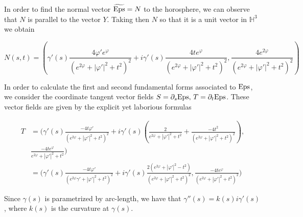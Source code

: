 \documentclass[12pt]{amsart}
\newcommand{\Eps}{{\rm Eps}}
\begin{document}
In order to find the normal vector $\widetilde{\Eps}=N$ to the horosphere, we can observe that $N$ is parallel to the vector $Y$. Taking then $N$ so that it is a unit vector in $\mathbb{H}^3$ we obtain


\begin{equation}\label{eq:normalvector}
N(s,t) = \left( \gamma'(s)\frac{4\varphi'e^{\varphi}}{(e^{2\varphi}+|\varphi'|^2+t^2)^2}+ i\gamma'(s)\frac{4te^{\varphi}}{(e^{2\varphi}+|\varphi'|^2+t^2)^2},  \frac{4e^{2\varphi}}{(e^{2\varphi}+|\varphi'|^2+t^2)^2}\right)
\end{equation}

In order to calculate the first and second fundamental forms associated to $\Eps$, we consider the coordinate tangent vector fields $S= \partial_s\Eps,\, T=\partial_t\Eps$. These vector fields are given by the explicit yet laborious formulas

\begin{equation}\label{eq:Tvector}
\begin{split}
    T &= \bigg( \gamma'(s)\frac{-4t\varphi'}{(e^{2\varphi}+|\varphi'|^2+t^2)^2}+ i\gamma'(s)\left(\frac{2}{e^{2\varphi}+|\varphi'|^2+t^2} + \frac{-4t^2}{(e^{2\varphi}+|\varphi'|^2+t^2)^2}\right),\\&  \frac{-4te^{\varphi}}{e^{2\varphi}+|\varphi'|^2+t^2}\bigg)
    \\& = \bigg(\gamma'(s)\frac{-4t\varphi'}{(e^{2\varphi}\gamma'+|\varphi'|^2+t^2)^2} +  i\gamma'(s)\frac{2(e^{2\varphi} + |\varphi'|^2-t^2)}{(e^{2\varphi}+|\varphi'|^2+t^2)^2}, \frac{-4te^{\varphi}}{(e^{2\varphi}+|\varphi'|^2+t^2)^2}\bigg)
\end{split}
\end{equation}



Since $\gamma(s)$ is parametrized by arc-length, we have that $\gamma''(s)=k(s)i\gamma'(s)$, where $k(s)$ is the curvature at $\gamma(s)$.
\end{document}
